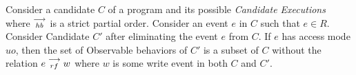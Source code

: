 \begin{theorem}
    \label{ReadElim}
    Consider a candidate $C$ of a program and its possible \textit{Candidate Executions} where $\stackrel{\longrightarrow}{_\textit{hb}}$ is a strict partial order. Consider an event $e$ in $C$ such that $e \in R$. 
    Consider Candidate $C'$ after eliminating the event $e$ from $C$. 
    If $e$ has access mode $uo$, then the set of Observable behaviors of $C'$ is a subset of $C$ without the relation $e\stackrel{\longrightarrow}{_{rf}}w$ where $w$ is some write event in both $C$ and $C'$.   
\end{theorem}